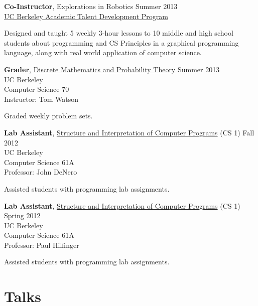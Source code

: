 \documentclass[margin,line,hyperref,color]{res}
\newenvironment{packed_itemize}{
\begin{itemize}[leftmargin=1.5em]
  \setlength{\itemsep}{0pt}
  \setlength{\parskip}{0pt}
  \setlength{\parsep}{0pt}
}{\end{itemize}}
\begin{document}
\begin{resume}
\textbf{Co-Instructor}, Explorations in Robotics
  \hfill Summer 2013\\
 \href{https://atdp.berkeley.edu/}{UC Berkeley Academic Talent Development Program}
 \begin{packed_itemize}
\item Designed and taught 5 weekly 3-hour lessons to 10 middle and high school students about programming and CS Principles in a graphical programming language, along with real world application of computer science.
\end{packed_itemize}


\textbf{Grader}, \href{http://inst.eecs.berkeley.edu/~cs70/su13/}{Discrete Mathematics and Probability Theory} \hfill Summer 2013\\
UC Berkeley \\
   Computer Science 70\\
  Instructor: Tom Watson 
  \begin{packed_itemize}
 \item Graded weekly problem sets.
  \end{packed_itemize}



\textbf{Lab Assistant}, \href{http://www-inst.eecs.berkeley.edu/~cs61a/fa12/}{Structure and Interpretation of Computer Programs} (CS 1) 
  \hfill Fall 2012\\
UC Berkeley\\
  Computer Science 61A\\
  Professor: John DeNero
    \begin{packed_itemize}
\item Assisted students with programming lab assignments.
  \end{packed_itemize}


\textbf{Lab Assistant}, \href{http://www-inst.eecs.berkeley.edu/~cs61a/sp12/}{Structure and Interpretation of Computer Programs} (CS 1) 
  \hfill Spring 2012\\
UC Berkeley\\
 Computer Science 61A\\
  Professor: Paul Hilfinger
      \begin{packed_itemize}
\item Assisted students with programming lab assignments.
  \end{packed_itemize}



\section{\sc Talks}



\end{resume}
\end{document}
